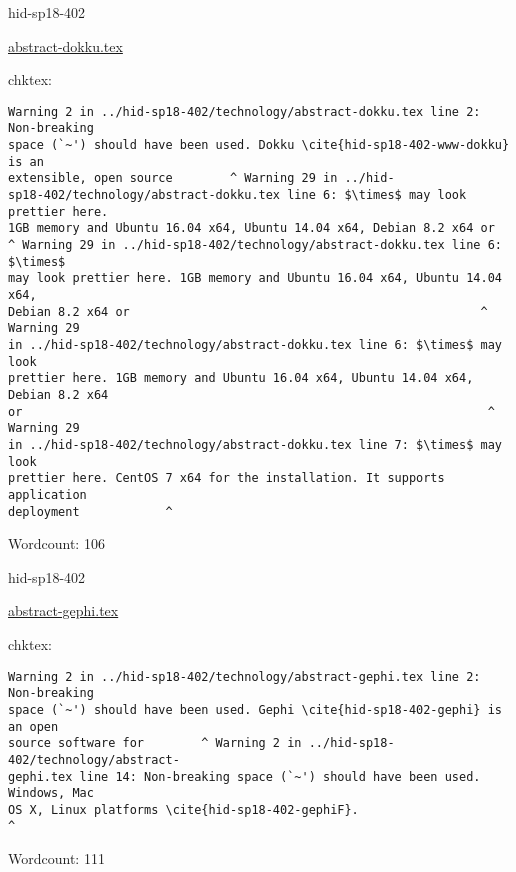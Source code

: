 \begin{IU}

hid-sp18-402

\href{https://github.com/cloudmesh-community/hid-sp18-402/blob/master//technology/abstract-dokku.tex}{abstract-dokku.tex}

 
chktex:
\begin{tiny}
\begin{verbatim}
Warning 2 in ../hid-sp18-402/technology/abstract-dokku.tex line 2: Non-breaking
space (`~') should have been used. Dokku \cite{hid-sp18-402-www-dokku} is an
extensible, open source        ^ Warning 29 in ../hid-
sp18-402/technology/abstract-dokku.tex line 6: $\times$ may look prettier here.
1GB memory and Ubuntu 16.04 x64, Ubuntu 14.04 x64, Debian 8.2 x64 or
^ Warning 29 in ../hid-sp18-402/technology/abstract-dokku.tex line 6: $\times$
may look prettier here. 1GB memory and Ubuntu 16.04 x64, Ubuntu 14.04 x64,
Debian 8.2 x64 or                                                 ^ Warning 29
in ../hid-sp18-402/technology/abstract-dokku.tex line 6: $\times$ may look
prettier here. 1GB memory and Ubuntu 16.04 x64, Ubuntu 14.04 x64, Debian 8.2 x64
or                                                                 ^ Warning 29
in ../hid-sp18-402/technology/abstract-dokku.tex line 7: $\times$ may look
prettier here. CentOS 7 x64 for the installation. It supports application
deployment            ^
\end{verbatim}
\end{tiny}

Wordcount: 106

\end{IU}



\begin{IU}

hid-sp18-402

\href{https://github.com/cloudmesh-community/hid-sp18-402/blob/master//technology/abstract-gephi.tex}{abstract-gephi.tex}

 
chktex:
\begin{tiny}
\begin{verbatim}
Warning 2 in ../hid-sp18-402/technology/abstract-gephi.tex line 2: Non-breaking
space (`~') should have been used. Gephi \cite{hid-sp18-402-gephi} is an open
source software for        ^ Warning 2 in ../hid-sp18-402/technology/abstract-
gephi.tex line 14: Non-breaking space (`~') should have been used. Windows, Mac
OS X, Linux platforms \cite{hid-sp18-402-gephiF}.
^
\end{verbatim}
\end{tiny}

Wordcount: 111

\end{IU}

